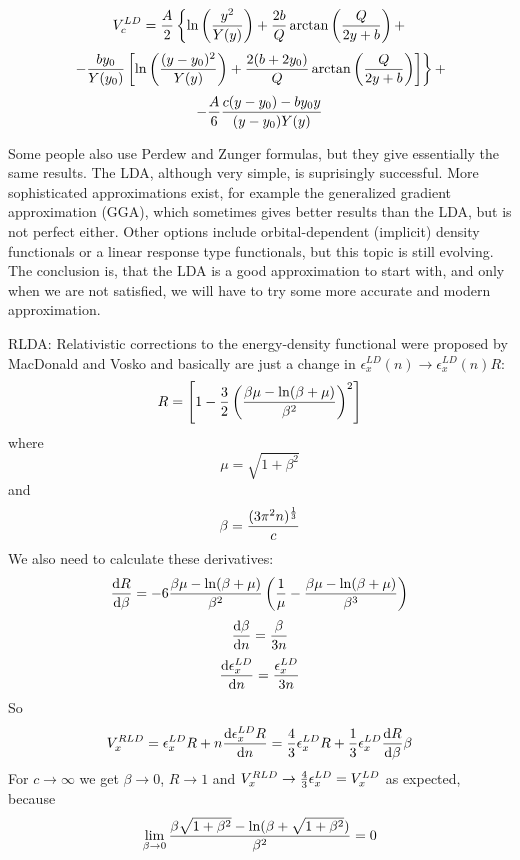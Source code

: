 \begin{equation*}
  V_c^{LD}={A\over2}\left\{ \ln\left(y^2\over Y(y)\right)+{2b\over Q}\arctan\left(Q\over 2y+b\right)+ \right.
\end{equation*}
\begin{equation*}
  \left. -{by_0\over Y(y_0)}\left[\ln\left((y-y_0)^2\over Y(y)\right) +{2(b+2y_0)\over Q}\arctan\left(Q\over 2y+b\right) \right] \right\}+
\end{equation*}
\begin{equation*}
  -{A\over6}{c(y-y_0)-by_0y\over (y-y_0)Y(y)}
\end{equation*}

Some people also use Perdew and Zunger formulas, but they give essentially the same results. The LDA, although very simple, is suprisingly successful. More sophisticated approximations exist, for example the generalized gradient approximation (GGA), which sometimes gives better results than the LDA, but is not perfect either. Other options include orbital-dependent (implicit) density functionals or a linear response type functionals, but this topic is still evolving. The conclusion is, that the LDA is a good approximation to start with, and only when we are not satisfied, we will have to try some more accurate and modern approximation.

RLDA: Relativistic corrections to the energy-density functional were proposed by MacDonald and Vosko and basically are just a change in $\epsilon_x^{LD}(n)\rightarrow\epsilon_x^{LD}(n)R$: 
\begin{equation*}
  R = \left[1-{3\over2}\left(\beta\mu-\ln(\beta+\mu)\over\beta^2\right)^2\right]
\end{equation*}
where 
\begin{equation*}
  \mu=\sqrt{1+\beta^2}
\end{equation*}
and 
\begin{equation*}
  \beta={(3\pi^2n)^{1\over3}\over c}
\end{equation*}
We also need to calculate these derivatives: 
\begin{equation*}
  {{\rm d}R\over{\rm d}\beta}= -6{\beta\mu-\ln(\beta+\mu)\over\beta^2}\left({1\over\mu}- {\beta\mu-\ln(\beta+\mu)\over\beta^3}\right)
\end{equation*}
\begin{equation*}
  {{\rm d}\beta\over{\rm d}n}={\beta\over 3n}
\end{equation*}
\begin{equation*}
  {{\rm d}\epsilon_x^{LD}\over{\rm d}n}={\epsilon_x^{LD}\over 3n}
\end{equation*}
So 
\begin{equation*}
  V_x^{RLD}=\epsilon_x^{LD}R+n{{\rm d} \epsilon_x^{LD}R\over{\rm d} n}= {4\over3}\epsilon_x^{LD}R+{1\over3}\epsilon_x^{LD}{{\rm d} R\over{\rm d}\beta}\beta
\end{equation*}
For $c\to\infty$ we get $\beta\to0$, $R\to1$ and $V_x^{RLD}\to {4\over3}\epsilon_x^{LD}=V_x^{LD}$ as expected, because 
\begin{equation*}
  \lim_{\beta\to0}{\beta\sqrt{1+\beta^2}-\ln(\beta+\sqrt{1+\beta^2})\over \beta^2} = 0
\end{equation*}

